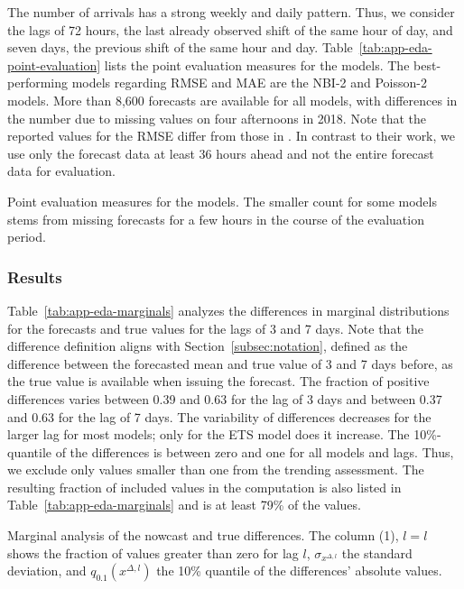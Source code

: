 The number of arrivals has a strong weekly and daily pattern.
Thus, we consider the lags of 72 hours, the last already observed shift of the same hour of day, and seven days, the previous shift of the same hour and day.
Table~\ref{tab:app-eda-point-evaluation} lists the point evaluation measures for the models.
The best-performing models regarding RMSE and MAE are the NBI-2 and Poisson-2 models.
More than 8,600 forecasts are available for all models, with differences in the number due to missing values on four afternoons in 2018.
Note that the reported values for the RMSE differ from those in \textcite{Rostami-Tabar2023}.
In contrast to their work, we use only the forecast data at least 36 hours ahead and not the entire forecast data for evaluation.

\begin{table}
\centering

\caption{Point evaluation measures for the models. The smaller count for some models stems from missing forecasts for a few hours in the course of the evaluation period.}\label{tab:app-eda-point-evaluation}
\end{table}


\subsubsection*{Results}

Table~\ref{tab:app-eda-marginals} analyzes the differences in marginal distributions for the forecasts and true values for the lags of 3 and 7 days.
Note that the difference definition aligns with Section~\ref{subsec:notation}, defined as the difference between the forecasted mean and true value of 3 and 7 days before, as the true value is available when issuing the forecast.
The fraction of positive differences varies between 0.39 and 0.63 for the lag of 3 days and between 0.37 and 0.63 for the lag of 7 days.
The variability of differences decreases for the larger lag for most models; only for the ETS model does it increase.
The 10\%-quantile of the differences is between zero and one for all models and lags.
Thus, we exclude only values smaller than one from the trending assessment.
The resulting fraction of included values in the computation is also listed in Table~\ref{tab:app-eda-marginals} and is at least 79\% of the values.

\begin{table}
    \centering
    
    \caption{Marginal analysis of the nowcast and true differences. The column (1), $l=l$ shows the fraction of values greater than zero for lag $l$, $\sigma_{x^{\Delta, l}}$ the standard deviation, and $q_{0.1} (x^{\Delta, l})$ the 10\% quantile of the differences' absolute values.}
    \label{tab:app-eda-marginals}
\end{table}

